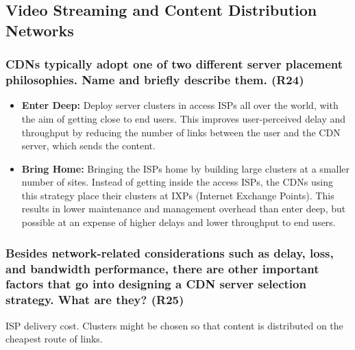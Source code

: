 \subsection{Video Streaming and Content Distribution Networks}


\subsubsection{CDNs typically adopt one of two different server placement philosophies. Name and briefly describe them. (R24)}
\begin{itemize}
    \item \textbf{Enter Deep:} Deploy server clusters in access ISPs all over the world, with the aim of getting close to end users. This improves user-perceived delay and throughput by reducing the number of links between the user and the CDN server, which sends the content.
    \item \textbf{Bring Home:} Bringing the ISPs home by building large clusters at a smaller number of sites. Instead of getting inside the access ISPs, the CDNs using this strategy place their clusters at IXPs (Internet Exchange Points). This results in lower maintenance and management overhead than enter deep, but possible at an expense of higher delays and lower throughput to end users.
\end{itemize}


\subsubsection{Besides network-related considerations such as delay, loss, and bandwidth performance, there are other important factors that go into designing a CDN server selection strategy. What are they? (R25)}

ISP delivery cost. Clusters might be chosen so that content is distributed on the cheapest route of links.